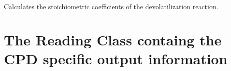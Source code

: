 \documentclass[letterpaper,10pt,english]{sphinxmanual}
\begin{document}
\begin{fulllineitems}
\begin{fulllineitems}
\end{fulllineitems}


\begin{fulllineitems}
\label{CPDClasses:Compos_and_Energy.CPD_SpeciesBalance._CPD_SpeciesBalance__nysEq15}
Calculates the stoichiometric coefficients of the devolatilization reaction.

\end{fulllineitems}


\end{fulllineitems}



\section{The Reading Class containg the CPD specific output information}
\label{CPDClasses:the-reading-class-containg-the-cpd-specific-output-information}
\end{document}
